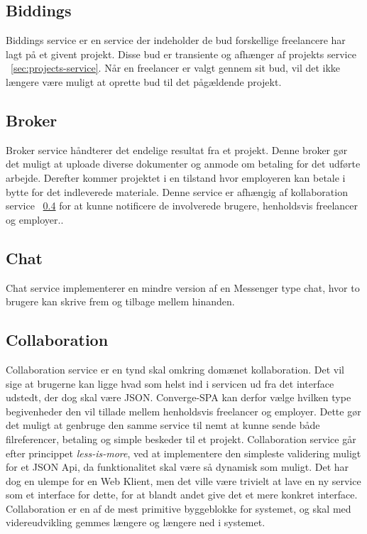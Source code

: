 \subsection{Biddings}
\label{sec:biddings-service}

Biddings service er en service der indeholder de bud forskellige freelancere har lagt på et givent projekt. Disse bud er transiente og afhænger af projekts service ~\ref{sec:projects-service}. Når en freelancer er valgt gennem sit bud, vil det ikke længere være muligt at oprette bud til det pågældende projekt.


\subsection{Broker}
\label{sec:broker-service}

Broker service håndterer det endelige resultat fra et projekt. Denne broker gør det muligt at uploade diverse dokumenter og anmode om betaling for det udførte arbejde. Derefter kommer projektet i en tilstand hvor employeren kan betale i bytte for det indleverede materiale. Denne service er afhængig af kollaboration service ~\ref{sec:collaboration-service} for at kunne notificere de involverede brugere, henholdsvis freelancer og employer..

\subsection{Chat}
\label{sec:chat-service}

Chat service implementerer en mindre version af en Messenger type chat, hvor to brugere kan skrive frem og tilbage mellem hinanden.

\subsection{Collaboration}
\label{sec:collaboration-service}

Collaboration service er en tynd skal omkring domænet kollaboration. Det vil sige at brugerne kan ligge hvad som helst ind i servicen ud fra det interface udstedt, der dog skal være JSON. Converge-SPA kan derfor vælge hvilken type begivenheder den vil tillade mellem henholdsvis freelancer og employer. Dette gør det muligt at genbruge den samme service til nemt at kunne sende både filreferencer, betaling og simple beskeder til et projekt. Collaboration service går efter princippet \emph{less-is-more}, ved at implementere den simpleste validering muligt for et JSON Api, da funktionalitet skal være så dynamisk som muligt. Det har dog en ulempe for en Web Klient, men det ville være trivielt at lave en ny service som et interface for dette, for at blandt andet give det et mere konkret interface. Collaboration er en af de mest primitive byggeblokke for systemet, og skal med videreudvikling gemmes længere og længere ned i systemet.

